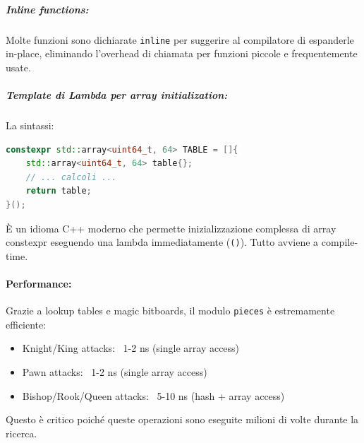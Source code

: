 \subparagraph{Inline functions:}
Molte funzioni sono dichiarate \texttt{inline} per suggerire al compilatore di
espanderle in-place, eliminando l'overhead di chiamata per funzioni piccole e
frequentemente usate.

\subparagraph{Template di Lambda per array initialization:}
La sintassi:
\begin{lstlisting}[language=C++]
constexpr std::array<uint64_t, 64> TABLE = []{
    std::array<uint64_t, 64> table{};
    // ... calcoli ...
    return table;
}();
\end{lstlisting}

È un idioma C++ moderno che permette inizializzazione complessa di array constexpr
eseguendo una lambda immediatamente (\texttt{()}). Tutto avviene a compile-time.

\paragraph{Performance:}

Grazie a lookup tables e magic bitboards, il modulo \texttt{pieces} è estremamente efficiente:
\begin{itemize}
  \item Knight/King attacks: ~1-2 ns (single array access)
  \item Pawn attacks: ~1-2 ns (single array access)
  \item Bishop/Rook/Queen attacks: ~5-10 ns (hash + array access)
\end{itemize}

Questo è critico poiché queste operazioni sono eseguite milioni di volte durante la ricerca.
